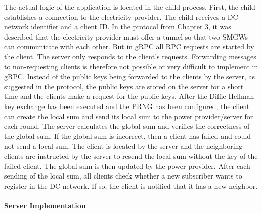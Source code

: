The actual logic of the application is located in the child process. First, the child establishes a connection to the electricity provider. The child receives a DC network identifier and a client ID. In the protocol from Chapter 3, it was described that the electricity provider must offer a tunnel so that two SMGWs can communicate with each other. But in gRPC all RPC requests are started by the client. The server only responds to the client's requests. Forwarding messages to non-requesting clients is therefore not possible or very difficult to implement in gRPC. Instead of the public keys being forwarded to the clients by the server, as suggested in the protocol, the public keys are stored on the server for a short time and the clients make a request for the public keys. After the Diffie Hellman key exchange has been executed and the PRNG has been configured, the client can create the local sum and send its local sum to the power provider/server for each round. The server calculates the global sum and verifies the correctness of the global sum. If the global sum is incorrect, then a client has failed and could not send a local sum. The client is located by the server and the neighboring clients are instructed by the server to resend the local sum without the key of the failed client. The global sum is then updated by the power provider. After each sending of the local sum, all clients check whether a new subscriber wants to register in the DC network. If so, the client is notified that it has a new neighbor. %
\\
\\
\textbf{Server Implementation}
\\
\\





\cleardoublepage